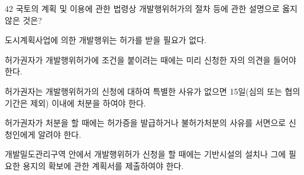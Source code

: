 \begin{question}{42}
국토의 계획 및 이용에 관한 법령상 개발행위허가의 절차 등에 관한 설명으로 옳지 않은 것은?
\begin{choices}
  \item 도시계획사업에 의한 개발행위는 허가를 받을 필요가 없다.
  \item 허가권자가 개발행위허가에 조건을 붙이려는 때에는 미리 신청한 자의 의견을 들어야 한다.
  \item 허가권자는 개발행위허가의 신청에 대하여 특별한 사유가 없으면 15일(심의 또는 협의기간은 제외) 이내에 처분을 하여야 한다.
  \item 허가권자가 처분을 할 때에는 허가증을 발급하거나 불허가처분의 사유를 서면으로 신청인에게 알려야 한다.
  \item 개발밀도관리구역 안에서 개발행위허가 신청을 할 때에는 기반시설의 설치나 그에 필요한 용지의 확보에 관한 계획서를 제출하여야 한다.
\end{choices}
\end{question}
